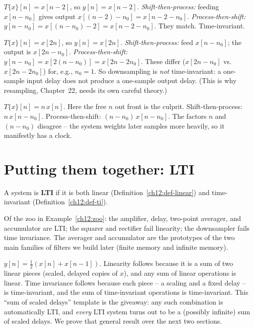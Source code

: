 \begin{example}
$T\{x\}[n] = x[n-2]$, so $y[n] = x[n-2]$.
\emph{Shift-then-process:} feeding $x[n-n_0]$ gives output $x[(n-2)-n_0] =
x[n-2-n_0]$.
\emph{Process-then-shift:} $y[n-n_0] = x[(n-n_0)-2] = x[n-2-n_0]$.
They match. Time-invariant. \checkmark
\end{example}

\begin{example}
\label{ch12:downsampler}
$T\{x\}[n] = x[2n]$, so $y[n] = x[2n]$.
\emph{Shift-then-process:} feed $x[n-n_0]$; the output is $x[2n - n_0]$.
\emph{Process-then-shift:} $y[n-n_0] = x[2(n-n_0)] = x[2n - 2n_0]$.
These differ ($x[2n-n_0]$ vs.\ $x[2n-2n_0]$) for, e.g., $n_0=1$. So
downsampling is \emph{not} time-invariant: a one-sample input delay does not
produce a one-sample output delay. (This is why resampling, Chapter~22, needs
its own careful theory.)
\end{example}

\begin{example}
$T\{x\}[n] = n\,x[n]$. Here the free $n$ out front is the culprit.
Shift-then-process: $n\,x[n-n_0]$. Process-then-shift: $(n-n_0)\,x[n-n_0]$.
The factors $n$ and $(n-n_0)$ disagree -- the system weights later samples more
heavily, so it manifestly has a clock.
\end{example}

\section{Putting them together: LTI}
\label{ch12:lti}

\begin{definition}
\label{ch12:def-lti}
A system is \textbf{LTI} if it is both linear (Definition~\ref{ch12:def-linear})
and time-invariant (Definition~\ref{ch12:def-ti}).
\end{definition}

Of the zoo in Example~\ref{ch12:zoo}: the amplifier, delay, two-point averager,
and accumulator are LTI; the squarer and rectifier fail linearity; the
downsampler fails time invariance. The averager and accumulator are the prototypes of the two main families of filters we build later (finite memory and infinite memory).

\begin{example}
$y[n] = \tfrac12(x[n] + x[n-1])$. Linearity follows because it is a sum of two
linear pieces (scaled, delayed copies of $x$), and any sum of linear operations
is linear. Time invariance follows because each piece -- a scaling and a fixed
delay -- is time-invariant, and the sum of time-invariant operations is
time-invariant. This ``sum of scaled delays'' template is the giveaway: any such
combination is automatically LTI, and \emph{every} LTI system turns out to be
a (possibly infinite) sum of scaled delays. We prove that general result over the
next two sections.
\end{example}

